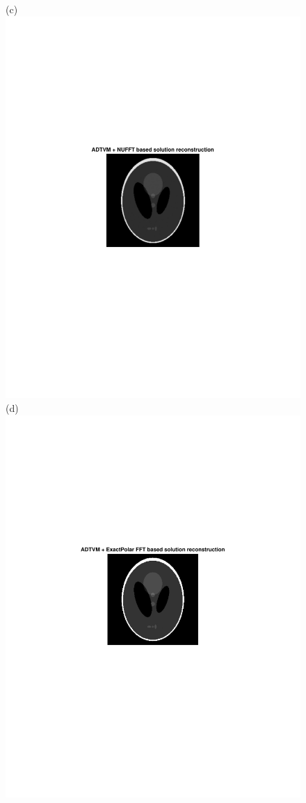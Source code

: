 \documentclass{UCF_ETD}
\begin{document}
\begin{figure}[H]
\begin{center}
(c)\includegraphics[scale=0.51]{SparseViewCT/Recons_NUFFT_ADTVM}
(d)\includegraphics[scale=0.52]{SparseViewCT/Recons_ExactPolar_ADTVM}

\end{center}
\end{figure}
\end{document}
